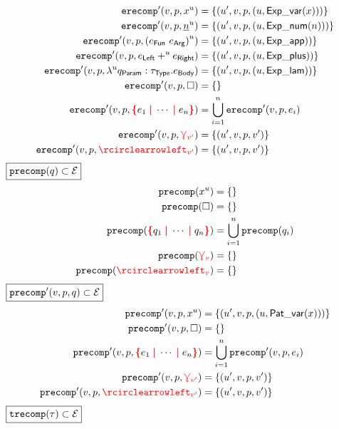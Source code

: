 \begin{align*}
  \erecompPrime{v}{p}{\varExp{x}{u}}
  &= \{(u', v, p, (u, \ExpVar(x)))\}
  \\
  \erecompPrime{v}{p}{\numExp{n}{u}}
  &= \{(u', v, p, (u, \ExpNum(n)))\}
  \\
  \erecompPrime{v}{p}{\appExp{e_\AppFun}{e_\AppArg}{u}}
  &= \{(u', v, p, (u, \ExpApp))\}
  \\
  \erecompPrime{v}{p}{\plusExp{e_\PlusLeft}{u} {e_\PlusRight}}
  &= \{(u', v, p, (u, \ExpPlus))\}
  \\
  \erecompPrime{v}{p}{\lamExp{u}{q_\LamParam}{\tau_\LamType}{e_\LamBody}}
  &= \{(u', v, p, (u, \ExpLam))\}
  \\
  \erecompPrime{v}{p}{\hole} &= \{\}
  \\
  \erecompPrime{v}{p}{\conflictHole{e_1, \cdots, e_n}}
  &= \bigcup_{i=1}^n \erecompPrime{v}{p}{e_i}
  \\
  \erecompPrime{v}{p}{\multiVertex{v'}}
  &= \{(u', v, p, v')\}
  \\
  \erecompPrime{v}{p}{\cycleVertex{v'}}
  &= \{(u', v, p, v')\}
\end{align*}
%
$\boxed{\operatorname{\texttt{precomp}}\mathopen{}\left(q\right)\mathclose{} \subset \mathcal{E}}$
%
\begin{align*}
  \precomp{\varPat{x}{u}} &= \{\}
  \\
  \precomp{\hole} &= \{\}
  \\
  \precomp{\conflictHole{q_1, \cdots, q_n}}
  &= \bigcup_{i=1}^n \precomp{q_i}
  \\
  \precomp{\multiVertex{v}} &= \{\}
  \\
  \precomp{\cycleVertex{v}} &= \{\}
\end{align*}
%
$\boxed{\operatorname{\operatorname{\texttt{precomp}}^\prime}\mathopen{}\left(v, p, q\right)\mathclose{} \subset \mathcal{E}}$
%
\begin{align*}
  \precompPrime{v}{p}{\varPat{x}{u}}
  &= \{(u', v, p, (u, \PatVar(x)))\}
  \\
  \precompPrime{v}{p}{\hole} &= \{\}
  \\
  \precompPrime{v}{p}{\conflictHole{e_1, \cdots, e_n}}
  &= \bigcup_{i=1}^n \precompPrime{v}{p}{e_i}
  \\
  \precompPrime{v}{p}{\multiVertex{v'}}
  &= \{(u', v, p, v')\}
  \\
  \precompPrime{v}{p}{\cycleVertex{v'}}
  &= \{(u', v, p, v')\}
\end{align*}
%
$\boxed{\operatorname{\texttt{trecomp}}\mathopen{}\left(\tau\right)\mathclose{} \subset \mathcal{E}}$
%
